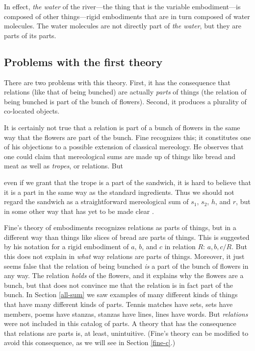 \documentclass[12pt,twoside]{reedfancy}
\newenvironment{squote}{%
	\begin{spacing}{1}
	\begin{list}{}{%
	\setlength{\labelwidth}{0pt}%
	\rightmargin\leftmargin%
	}
	\item\relax
	}{%
	\end{list}%
	\end{spacing}
	}
\begin{document}
\begin{spacing}{1.25}
In effect, {\em the water} of the river---the thing that is the
variable embodiment---is composed of other things---rigid embodiments
that are in turn composed of water molecules.  The water molecules are
not directly part of {\em the water}, but they are parts of its parts.

\subsection{Problems with the first theory}
\label{problems1}
There are two problems with this theory.  First, it has the
consequence that relations (like that of being bunched) are actually
{\em parts} of things (the relation of being bunched is part of the
bunch of flowers).  Second, it produces a plurality of co-located
objects.

It is certainly not true that a relation is part of a bunch of flowers
in the same way that the flowers are part of the bunch.  Fine
recognizes this; it constitutes one of his objections to a possible
extension of classical mereology.  He observes that one could claim
that mereological sums are made up of things like bread and meat as
well as {\em tropes}, or relations.  But

\begin{squote}
even if we grant that the trope is a part of the sandwich, it is hard
to believe that it is a part in the same way as the standard
ingredients.  Thus we should not regard the sandwich as a
straightforward mereological sum of $s_1$, $s_2$, $h$, and $r$, but in
some other way that has yet to be made clear \citep[64]{fine1999}.
\end{squote}

Fine's theory of embodiments recognizes relations as parts of things,
but in a different way than things like slices of bread are parts of
things.  This is suggested by his notation for a rigid embodiment of
$a$, $b$, and $c$ in relation $R$: $a, b, c / R$.  But this does not
explain in {\em what} way relations are parts of things.  Moreover, it
just seems false that the relation of being bunched {\em is} a part of
the bunch of flowers in any way.  The relation {\em holds} of the
flowers, and it explains why the flowers are a bunch, but that does
not convince me that the relation is in fact part of the bunch.  In
Section \ref{all-sum} we saw examples of many different kinds of
things that have many different kinds of parts.  Tennis matches have
sets, sets have members, poems have stanzas, stanzas have lines, lines
have words.  But {\em relations} were not included in this catalog of
parts.  A theory that has the consequence that relations are parts is,
at least, unintuitive.  (Fine's theory can be modified to avoid this
consequence, as we will see in Section \ref{fine-c}.)


\end{spacing}
\end{document}
